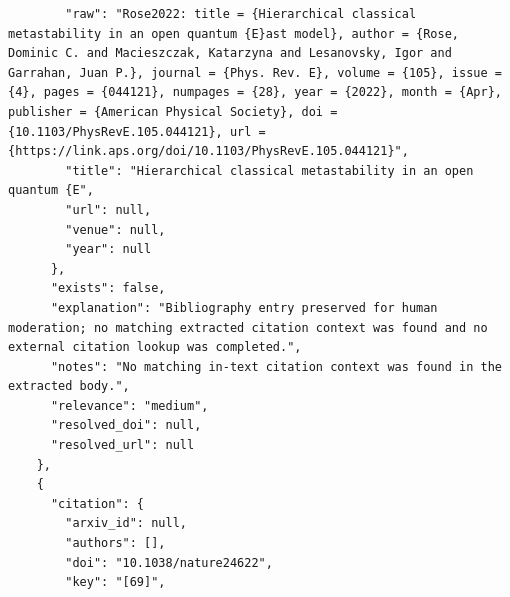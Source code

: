 \documentclass[11pt]{article}
\begin{document}
\begin{verbatim}
        "raw": "Rose2022: title = {Hierarchical classical metastability in an open quantum {E}ast model}, author = {Rose, Dominic C. and Macieszczak, Katarzyna and Lesanovsky, Igor and Garrahan, Juan P.}, journal = {Phys. Rev. E}, volume = {105}, issue = {4}, pages = {044121}, numpages = {28}, year = {2022}, month = {Apr}, publisher = {American Physical Society}, doi = {10.1103/PhysRevE.105.044121}, url = {https://link.aps.org/doi/10.1103/PhysRevE.105.044121}",
        "title": "Hierarchical classical metastability in an open quantum {E",
        "url": null,
        "venue": null,
        "year": null
      },
      "exists": false,
      "explanation": "Bibliography entry preserved for human moderation; no matching extracted citation context was found and no external citation lookup was completed.",
      "notes": "No matching in-text citation context was found in the extracted body.",
      "relevance": "medium",
      "resolved_doi": null,
      "resolved_url": null
    },
    {
      "citation": {
        "arxiv_id": null,
        "authors": [],
        "doi": "10.1038/nature24622",
        "key": "[69]",

\end{verbatim}
\end{document}
